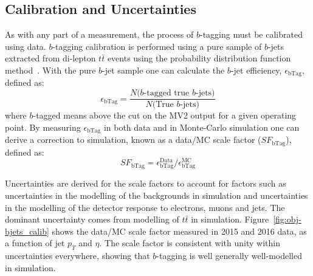 \subsection{Calibration and Uncertainties}
\label{sec:obj-bjets_calib}

As with any part of a measurement, the process of $b$-tagging must be calibrated using data.
$b$-tagging calibration is performed using a pure sample of $b$-jets extracted from di-lepton $t\bar{t}$ events
using the probability distribution function method~\cite{obj-bjets_calib_tech,obj-bjets_calib_plots}.
With the pure $b$-jet sample one can calculate the $b$-jet efficiency, $\epsilon_{\text{bTag}}$, defined as:
\begin{equation}
 \epsilon_{\text{bTag}} = \frac{N(\text{$b$-tagged true $b$-jets)}}{N(\text{True $b$-jets)}}
\end{equation}
where $b$-tagged means above the cut on the MV2 output for a given operating point.
By measuring $\epsilon_{\text{bTag}}$ in both data and in Monte-Carlo simulation one can derive
a correction to simulation, known as a data/MC scale factor ($SF_{\text{bTag}}$), defined as:
\begin{equation}
 SF_{\text{bTag}} = \epsilon_{\text{bTag}}^{\text{Data}}/\epsilon_{\text{bTag}}^{\text{MC}}
\end{equation}

Uncertainties are derived for the scale factors 
to account for factors such as
uncertainties in the modelling of the backgrounds in simulation and
uncertainties in the modelling of the detector response to electrons, muons and jets.
The dominant uncertainty comes from modelling of $t\bar{t}$ in simulation.
Figure~\ref{fig:obj-bjets_calib} shows the data/MC scale factor measured in 2015 and 2016 data, as a function of jet $p_T$ and $\eta$.
The scale factor is consistent with unity within uncertainties everywhere, showing that $b$-tagging is well generally well-modelled in simulation.

